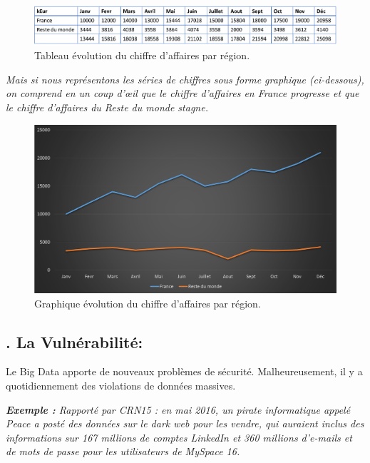 \begin{figure}[h]
	\centering
	\includegraphics[scale=0.4]{img/part1/1.4}
	\caption{Tableau évolution du chiffre d'affaires par région.}
\end{figure}

\textit{Mais si nous représentons les séries de chiffres sous forme graphique (ci-dessous), on comprend en un coup d'œil que le chiffre d'affaires en France progresse et que le chiffre d'affaires du Reste du monde stagne.}

\begin{figure}[h]
	\centering
	\includegraphics[scale=0.5]{img/part1/1.5}
	\caption{Graphique évolution du chiffre d'affaires par région.}
\end{figure}

\subsection*{. La Vulnérabilité:}
Le Big Data apporte de nouveaux problèmes de sécurité. Malheureusement, il y a quotidiennement des violations de données massives.

\textit{\textbf{Exemple :} Rapporté par CRN15 : en mai 2016, un pirate informatique appelé Peace a posté des données sur le dark web pour les vendre, qui auraient inclus des informations sur 167 millions de comptes LinkedIn et 360 millions d'e-mails et de mots de passe pour les utilisateurs de MySpace 16.}

